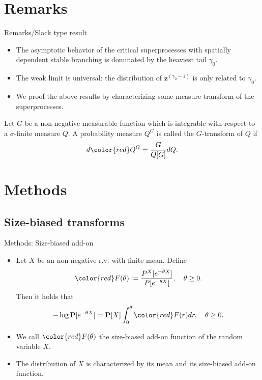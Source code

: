 \documentclass[xcolor=dvipsnames]{beamer}
\begin{document}
\section{Remarks}
\begin{frame}{Remarks/Slack type result}
  \begin{itemize}
  \item
    {\color{red} The asymptotic behavior} of the critical superprocesses with spatially dependent stable branching {\color{red} is dominated by the heaviest tail $\gamma_0$}.
  \item
    The weak limit is {\color{red} universal}: the distribution of $\mathbf z^{(\gamma_0 - 1)}$ is only related to $\gamma_0$.
  \item
    We proof the above results by characterizing some {\color{red} measure transform} of the superprocesses.
  \end{itemize}
  \begin{definition}
    Let $G$ be a non-negative measurable function which is integrable with respect to a $\sigma$-finite measure $Q$.
    A probability measure {\color{red} $Q^G$} is called the $G$-transform of $Q$ if
    \[
      d{\color{red} Q^G} = \frac{G}{Q[G]} dQ.
    \]
  \end{definition}
\end{frame}
\section{Methods} 
\subsection{Size-biased transforms}
\begin{frame}{Methods: Size-biased add-on}
\begin{itemize}
\item Let $X$ be an non-negative r.v. with finite mean. Define
  \begin{align}
    {\color{red} F(\theta)}:= \frac{P^X[e^{-\theta X}]}{P[e^{-\theta X}]}, \quad \theta \geq 0.
  \end{align}
Then it holds that
\[
-\log \mathbf P[e^{-\theta X}] 
= \mathbf P[X] \int_0^\theta {\color{red} F(r)} dr
,\quad \theta \geq 0.
\]
\item
We call ${\color{red} F(\theta)}$ the {\color{red} size-biased add-on} function of the random variable $X$.
\item  
The distribution of $X$ is characterized by its mean and its size-biased add-on function.
\end{itemize}
\end{frame}
\end{document}
